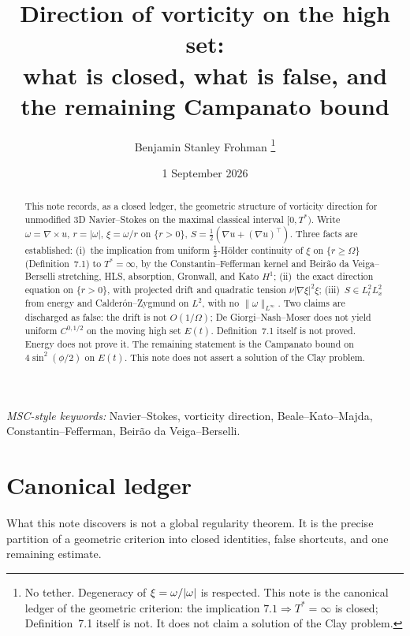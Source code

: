 \documentclass[11pt,a4paper]{article}
\title{Direction of vorticity on the high set:\\
what is closed, what is false, and the remaining Campanato bound}
\author{Benjamin Stanley Frohman%
\thanks{No tether. Degeneracy of \(\xi=\omega/\abs{\omega}\) is respected.
This note is the canonical ledger of the geometric criterion: the
implication \(7.1\Rightarrow T^*=\infty\) is closed; Definition~7.1
itself is not. It does not claim a solution of the Clay problem.}}
\date{1 September 2026}
\theoremstyle{definition}
\theoremstyle{remark}
\newcommand{\abs}[1]{\lvert#1\rvert}
\newcommand{\norm}[1]{\lVert#1\rVert}
\begin{document}
\maketitle

\begin{abstract}
This note records, as a closed ledger, the geometric structure of vorticity
direction for unmodified 3D Navier--Stokes on the maximal classical interval
\([0,T^*)\). Write \(\omega=\nabla\times u\), \(r=\abs{\omega}\),
\(\xi=\omega/r\) on \(\{r>0\}\),
\(S=\tfrac12(\nabla u+(\nabla u)^\top)\).
Three facts are established: (i)~the implication from uniform
\(\tfrac12\)-H\"older continuity of \(\xi\) on \(\{r\ge\Omega\}\)
(Definition~7.1) to \(T^*=\infty\), by the Constantin--Fefferman kernel
and Beir\~ao da Veiga--Berselli stretching, HLS, absorption, Gronwall,
and Kato \(H^1\); (ii)~the exact direction equation on \(\{r>0\}\), with
projected drift and quadratic tension \(\nu\abs{\nabla\xi}^2\xi\);
(iii)~\(S\in L^2_t L^2_x\) from energy and Calder\'on--Zygmund on \(L^2\),
with no \(\norm{\omega}_{L^\infty}\).
Two claims are discharged as false: the drift is not \(O(1/\Omega)\);
De Giorgi--Nash--Moser does not yield uniform \(C^{0,1/2}\) on the moving
high set \(E(t)\). Definition~7.1 itself is not proved. Energy does not
prove it. The remaining statement is the Campanato bound on
\(4\sin^2(\phi/2)\) on \(E(t)\). This note does not assert a solution of
the Clay problem.
\end{abstract}

\noindent\textit{MSC-style keywords:} Navier--Stokes, vorticity direction,
Beale--Kato--Majda, Constantin--Fefferman, Beir\~ao da Veiga--Berselli.

\tableofcontents

\section{Canonical ledger}
\label{sec:ledger}

What this note discovers is not a global regularity theorem. It is the
precise partition of a geometric criterion into closed identities, false
shortcuts, and one remaining estimate.
\end{document}
